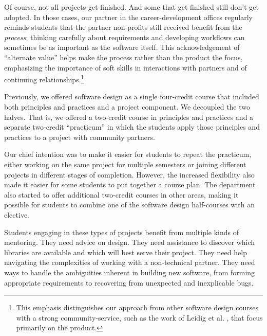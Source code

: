 Of course, not all projects get finished.  And some that get finished
still don't get adopted.  In those cases, our partner in the
career-development offices regularly reminds students that the
partner non-profits still received benefit from the \textit{process};
thinking carefully about requirements and developing workflows can
sometimes be as important as the software itself.  This 
acknowledgement of ``alternate value'' helps make the process
rather than the product the focus, emphasizing the importance of
soft skills in interactions with partners and of continuing
relationships.\footnote{This emphasis distinguishes
our approach from other software design courses with a strong
community-service, such as the work of Leidig et al.
\cite{leidig-2006,lange-2011}, that focus primarily on the product.}

Previously, we offered software design as a single
four-credit course that included both principles and practices
and a project component.  We decoupled the two halves.  That is,
we offered a two-credit course in principles and practices and a
separate two-credit ``practicum'' in which the students apply those
principles and practices to a project with community partners.

Our chief intention was to make it easier for students to repeat
the practicum, either working on the same project for multiple semesters
or joining different projects in different stages of completion.
However, the increased flexibility also made it easier for some students
to put together a course plan. 
The department also started to offer additional two-credit
courses in other areas, making it possible for students to combine
one of the software design half-courses with an elective.

Students engaging in these types of projects benefit from multiple
kinds of mentoring.  They need advice on design.  They need
assistance to discover which libraries are available and which will
best serve their project.  They need help navigating the complexities
of working with a non-technical partner.  They need
ways to handle the ambiguities inherent in building new software,
from forming appropriate requirements to recovering from unexpected
and inexplicable bugs.


